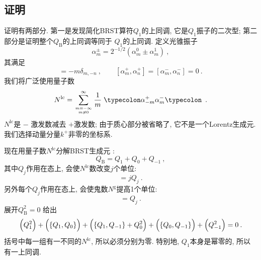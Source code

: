 \subsection*{证明}
证明有两部分. 第一是发现简化BRST算符$Q_{1}$的上同调, 它是$Q_{1}$振子的二次型; 第二部分是证明整个$Q_{\mathrm{B}}$的上同调等同于 $Q_{1}$的上同调. 
定义光锥振子
\begin{equation}
\alpha_{m}^{\pm}=2^{-1 / 2} (\alpha_{m}^{0} \pm \alpha_{m}^{1}) \:, \label{4.4.6}
\end{equation}
其满足
\begin{equation}
[\alpha_{m}^{+}, \alpha_{n}^{-}]=-m \delta_{m,-n} \:, \qquad [\alpha_{m}^{+}, \alpha_{n}^{+}]=[\alpha_{m}^{-}, \alpha_{n}^{-}]=0 \:. \label{4.4.7}
\end{equation}
我们将广泛使用量子数
\begin{equation}
N^{\mathrm{lc}}=\sum_{m=-\infty \atop m \neq 0}^{\infty} \frac{1}{m} \mathrel{\typecolon \alpha_{-m}^{+} \alpha_{m}^{-} \typecolon} \:. \label{4.4.8}
\end{equation}
$N^{\mathrm{lc}}$是 $-$ 激发数减去 $+$激发数; 由于质心部分被省略了, 它不是一个Lorentz生成元. 我们选择动量分量$k^{+}$非零的坐标系.

现在用量子数$N^{\mathrm{lc}}$分解BRST生成元 :
\begin{equation}
Q_{\mathrm{B}}=Q_{1}+Q_{0}+Q_{-1} \:, \label{4.4.9}
\end{equation}
其中$Q_{j}$作用在态上, 会使$N^{\mathrm{lc}}$数改变$j$个单位: 
\begin{equation}
[N^{\mathrm{lc}}, Q_{j}]=j Q_{j} \:. \label{4.4.10}
\end{equation}
另外每个$Q_{j}$作用在态上, 会使鬼数$N^{\mathrm{g}}$提高1个单位: 
\begin{equation}
[N^{\mathrm{g}}, Q_{j}]=Q_{j} \:. \label{4.4.11}
\end{equation}
展开$Q_{\mathrm{B}}^{2}=0$ 给出
\begin{equation}
\Bigl(Q_{1}^{2}\Bigr)+ \Bigl(\{Q_{1}, Q_{0}\}\Bigr)+\Bigl(\{Q_{1}, Q_{-1}\}+Q_{0}^{2}\Bigr)+\Bigl(\{Q_{0}, Q_{-1}\}\Bigr)+\Bigl(Q_{-1}^{2}\Bigr)=0 \:. 
\label{4.4.12}
\end{equation}
括号中每一组有一不同的$N^{\mathrm{lc}}$, 所以必须分别为零. 特别地, $Q_{1}$本身是幂零的, 所以有一上同调.

